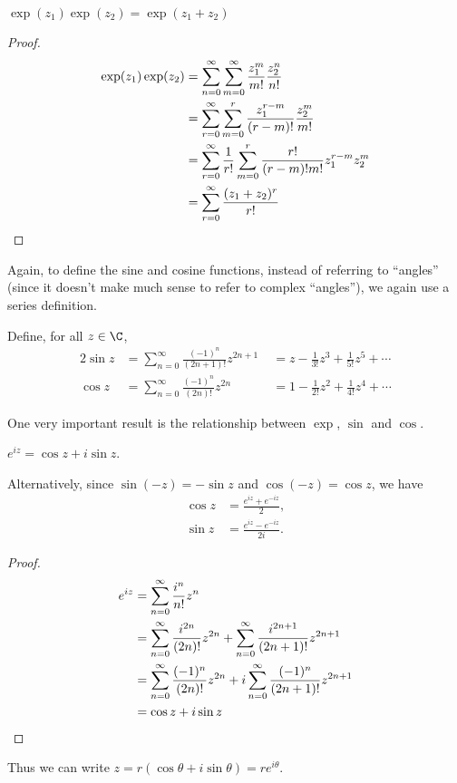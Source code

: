 \documentclass[a4paper]{article}
\begin{document}
\begin{thm}
  $\exp(z_1)\exp(z_2) = \exp(z_1 + z_2)$
\end{thm}

\begin{proof}
  \begin{align*}
    \exp(z_1)\exp(z_2) &= \sum_{n = 0}^\infty\sum_{m = 0}^\infty \frac{z_1^m}{m!}\frac{z_2^n}{n!}\\
    &= \sum_{r = 0}^\infty\sum_{m = 0}^r \frac{z_1^{r - m}}{(r - m)!}\frac{z_2^m}{m!}\\
    &= \sum_{r = 0}^\infty\frac{1}{r!}\sum_{m = 0}^r \frac{r!}{(r - m)!m!}z_1^{r - m}z_2^m\\
    &= \sum_{r = 0}^\infty\frac{(z_1 + z_2)^r}{r!} \qedhere
  \end{align*}
\end{proof}

Again, to define the sine and cosine functions, instead of referring to ``angles'' (since it doesn't make much sense to refer to complex ``angles''), we again use a series definition.
\begin{defi}
  Define, for all $z\in \C$,
  \begin{alignat*}{2}
    \sin z &= \sum_{n=0}^\infty \frac{(-1)^n}{(2n+1)!}z^{2n+1} &\;= z - \frac{1}{3!}z^3 + \frac{1}{5!}z^5 + \cdots\\
    \cos z &= \sum_{n=0}^\infty \frac{(-1)^n}{(2n)!}z^{2n} &\;= 1 - \frac{1}{2!}z^2 + \frac{1}{4!}z^4 + \cdots
  \end{alignat*}
\end{defi}

One very important result is the relationship between $\exp$, $\sin$ and $\cos$.
\begin{thm}
  $e^{iz} = \cos z + i\sin z$.
\end{thm}
Alternatively, since $\sin (-z) = -\sin z$ and $\cos(-z) = \cos z$, we have
\begin{align*}
  \cos z &= \frac{e^{iz} + e^{-iz}}{2},\\
  \sin z &= \frac{e^{iz} - e^{-iz}}{2i}.
\end{align*}

\begin{proof}
  \begin{align*}
    e^{iz} &= \sum_{n=0}^\infty \frac{i^n}{n!}z^n\\
    &= \sum_{n=0}^\infty \frac{i^{2n}}{(2n)!}z^{2n} + \sum_{n=0}^\infty \frac{i^{2n+1}}{(2n+1)!}z^{2n+1}\\
    &= \sum_{n=0}^\infty \frac{(-1)^n}{(2n)!}z^{2n} + i \sum_{n=0}^\infty \frac{(-1)^n}{(2n+1)!}z^{2n+1}\\
    &= \cos z + i\sin z \qedhere
  \end{align*}
\end{proof}
Thus we can write $z = r(\cos\theta + i\sin\theta) = re^{i\theta}$.
\end{document}
